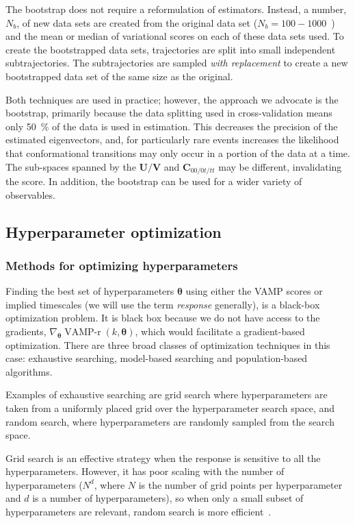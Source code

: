 \documentclass[journal=jacsat,manuscript=article]{achemso}
\begin{document}
The bootstrap does not require a reformulation of estimators. Instead, a number, $N_b$, of new data sets are created from the original data set ($N_b = 100 - 1000$~\cite{efronIntroductionBootstrap1993}) and the mean or median of variational scores on each of these data sets used. To create the bootstrapped data sets, 
trajectories are split into small independent subtrajectories. The subtrajectories are sampled \emph{with replacement} to create a new bootstrapped data set of the same size as the original. 

Both techniques are used in practice; however, the approach we advocate is the bootstrap, primarily because the data splitting used in cross-validation means only \SI{50}{\percent} of the data is used in estimation.  This decreases the precision of the estimated eigenvectors, and, for particularly rare events increases the likelihood that conformational transitions may only occur in a portion of the data at a time. The sub-spaces spanned by the $\mathbf{U}/\mathbf{V}$ and $\mathbf{C}_{00/0t/tt}$ may be different, invalidating the score. In addition, the bootstrap can be used for a wider variety of observables.
 
\subsection{Hyperparameter optimization}

\subsubsection{Methods for optimizing hyperparameters}

Finding the best set of hyperparameters $\bm{\theta}$ using either the VAMP scores or implied timescales (we will use the term \emph{response} generally), is a black-box optimization problem.  It is black box because we do not have access to the gradients, $\nabla_{\bm{\theta}} \operatorname{VAMP-r}(k, \bm{\theta})$, which would facilitate a gradient-based optimization. There are three broad classes of optimization techniques in this case: exhaustive searching, model-based searching and population-based algorithms. 

Examples of exhaustive searching are grid search where hyperparameters are taken from a uniformly placed grid over the hyperparameter search space, and random search, where hyperparameters are randomly sampled from the search space. 

Grid search is an effective strategy when the response is sensitive to all the hyperparameters.  However, it has poor scaling with the number of hyperparameters ($N^d$, where $N$ is the number of grid points per hyperparameter and $d$ is a number of hyperparameters), so when only a small subset of hyperparameters are relevant, random search is more efficient~\cite{bergstra_jamesbergstra_random_2012}.  
\end{document}
